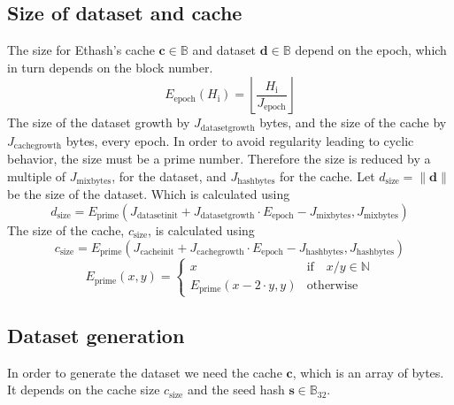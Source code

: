\documentclass[9pt,oneside]{amsart}
\makeatletter
\newcommand{\linkdest}[1]{\Hy@raisedlink{\hypertarget{#1}{}}}
\makeatother
\begin{document}
\subsection{Size of dataset and cache}
The size for Ethash's cache $\mathbf{c} \in \mathbb{B}$  and dataset $\mathbf{d} \in \mathbb{B}$ depend on the epoch, which in turn depends on the block number.
\begin{equation}
 E_{\mathrm{epoch}}(H_{\mathrm{i}}) = \left\lfloor\frac{H_{\mathrm{i}}}{J_{\mathrm{epoch}}}\right\rfloor
\end{equation}
The size of the dataset growth by $J_{\mathrm{datasetgrowth}}$ bytes, and the size of the cache by $J_{\mathrm{cachegrowth}}$ bytes, every epoch. In order to avoid regularity leading to cyclic behavior, the size must be a prime number. Therefore the size is reduced by a multiple of $J_{\mathrm{mixbytes}}$, for the dataset, and $J_{\mathrm{hashbytes}}$ for the cache.
\linkdest{d__size}{}Let $d_{\mathrm{size}} = \lVert \mathbf{d} \rVert$ be the size of the dataset. Which is calculated using
\begin{equation}
 d_{\mathrm{size}} = E_{\mathrm{prime}}(J_{\mathrm{datasetinit}} + J_{\mathrm{datasetgrowth}} \cdot E_{\mathrm{epoch}} - J_{\mathrm{mixbytes}}, J_{\mathrm{mixbytes}})
\end{equation}
The size of the cache, $c_{\mathrm{size}}$, is calculated using
\begin{equation}
 c_{\mathrm{size}} = E_{\mathrm{prime}}(J_{\mathrm{cacheinit}} + J_{\mathrm{cachegrowth}} \cdot E_{\mathrm{epoch}} - J_{\mathrm{hashbytes}}, J_{\mathrm{hashbytes}})
\end{equation}
\begin{equation}
 E_{\mathrm{prime}}(x, y) = \begin{cases}
x & \text{if} \quad x / y \in \mathbb{N} \\
E_{\mathrm{prime}}(x - 2 \cdot y, y) & \text{otherwise}
\end{cases}
\end{equation}
\subsection{Dataset generation}
In order to generate the dataset we need the cache $\mathbf{c}$, which is an array of bytes. It depends on the cache size  $c_{\mathrm{size}}$ and the seed hash $\mathbf{s} \in \mathbb{B}_{32}$.
\end{document}
